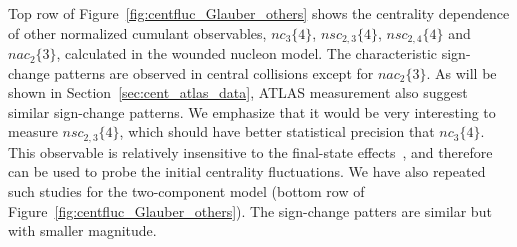 Top row of Figure~\ref{fig:centfluc_Glauber_others} shows the centrality dependence of other normalized cumulant observables, $nc_3\{4\}$, $nsc_{2,3}\{4\}$, $nsc_{2,4}\{4\}$ and $nac_{2}\{3\}$, calculated in the wounded nucleon model. The characteristic sign-change patterns are observed in central collisions except for $nac_2\{3\}$. As will be shown in Section~\ref{sec:cent_atlas_data}, ATLAS measurement also suggest similar sign-change patterns. We emphasize that it would be very interesting to measure $nsc_{2,3}\{4\}$, which should have better statistical precision that $nc_3\{4\}$. This observable is relatively insensitive to the final-state effects~\cite{Bilandzic:2013kga, Huo:2013qma, Aaboud:2017tql}, and therefore can be used to probe the initial centrality fluctuations. We have also repeated such studies for the two-component model (bottom row of Figure~\ref{fig:centfluc_Glauber_others}). The sign-change patters are similar but with smaller magnitude.

